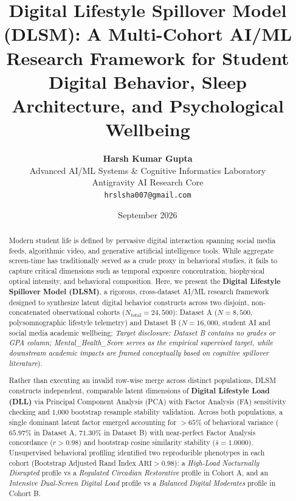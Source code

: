 \documentclass[10pt,twocolumn,a4paper]{article}
\title{\textbf{Digital Lifestyle Spillover Model (DLSM): A Multi-Cohort AI/ML Research Framework for Student Digital Behavior, Sleep Architecture, and Psychological Wellbeing}}
\author{
    \textbf{Harsh Kumar Gupta} \\
    Advanced AI/ML Systems \& Cognitive Informatics Laboratory \\
    Antigravity AI Research Core \\
    \texttt{hrslsha007@gmail.com}
}
\date{September 2026}
\begin{document}
\maketitle

\begin{abstract}
\noindent Modern student life is defined by pervasive digital interaction spanning social media feeds, algorithmic video, and generative artificial intelligence tools. While aggregate screen-time has traditionally served as a crude proxy in behavioral studies, it fails to capture critical dimensions such as temporal exposure concentration, biophysical optical intensity, and behavioral composition. Here, we present the \textbf{Digital Lifestyle Spillover Model (DLSM)}, a rigorous, cross-dataset AI/ML research framework designed to synthesize latent digital behavior constructs across two disjoint, non-concatenated observational cohorts ($N_{\text{total}} = 24,500$): Dataset A ($N = 8,500$, polysomnographic lifestyle telemetry) and Dataset B ($N = 16,000$, student AI and social media academic wellbeing; \textit{Target disclosure: Dataset B contains no grades or GPA column; Mental\_Health\_Score serves as the empirical supervised target, while downstream academic impacts are framed conceptually based on cognitive spillover literature}). 

Rather than executing an invalid row-wise merge across distinct populations, DLSM constructs independent, comparable latent dimensions of \textbf{Digital Lifestyle Load (DLL)} via Principal Component Analysis (PCA) with Factor Analysis (FA) sensitivity checking and 1,000 bootstrap resample stability validation. Across both populations, a single dominant latent factor emerged accounting for $>65\%$ of behavioral variance ($65.97\%$ in Dataset A, $71.30\%$ in Dataset B) with near-perfect Factor Analysis concordance ($r > 0.98$) and bootstrap cosine similarity stability ($\bar{s} = 1.0000$). Unsupervised behavioral profiling identified two reproducible phenotypes in each cohort (Bootstrap Adjusted Rand Index $\text{ARI} > 0.98$): a \textit{High-Load Nocturnally Disrupted} profile vs a \textit{Regulated Circadian Restorative} profile in Cohort A, and an \textit{Intensive Dual-Screen Digital Load} profile vs a \textit{Balanced Digital Moderates} profile in Cohort B. 


\end{abstract}
\end{document}
